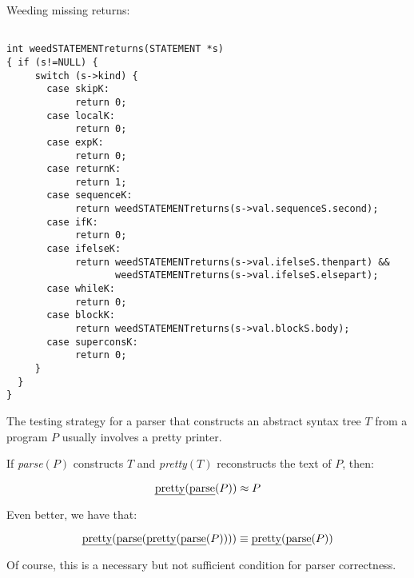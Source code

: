\begin{slide*}
Weeding missing returns:

\begin{tiny}
\begin{verbatim}

int weedSTATEMENTreturns(STATEMENT *s)
{ if (s!=NULL) {
     switch (s->kind) {
       case skipK:
            return 0;
       case localK:
            return 0;
       case expK:
            return 0;
       case returnK:
            return 1;
       case sequenceK:
            return weedSTATEMENTreturns(s->val.sequenceS.second);
       case ifK:
            return 0;
       case ifelseK:
            return weedSTATEMENTreturns(s->val.ifelseS.thenpart) &&
                   weedSTATEMENTreturns(s->val.ifelseS.elsepart);
       case whileK:
            return 0;
       case blockK:
            return weedSTATEMENTreturns(s->val.blockS.body);
       case superconsK:
            return 0;
     }
  }
}
\end{verbatim}
\end{tiny}
\vfil
\end{slide*}

\begin{slide*}
The testing strategy for a parser that constructs an abstract syntax
tree $T$ from a program $P$ usually involves a pretty printer.

If {\em parse}$(P)$ constructs $T$ and {\em pretty}$(T)$ reconstructs
the text of $P$, then:

\begin{small}
$$ \mbox{\em pretty}(\mbox{\em parse}(P)) \approx P $$
\end{small}

Even better, we have that:

\begin{small}
$$ \mbox{\em pretty}(\mbox{\em parse}(\mbox{\em pretty}(\mbox{\em parse}(P))))
\equiv \mbox{\em pretty}(\mbox{\em parse}(P))$$
\end{small}

Of course, this is a necessary but not sufficient condition for parser
correctness.
\vfil
\end{slide*}
 


